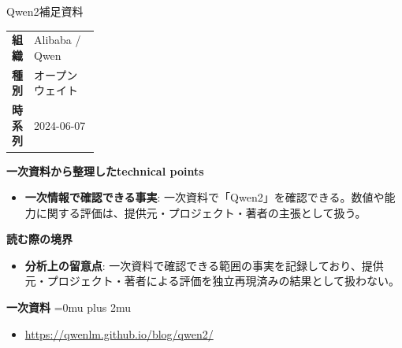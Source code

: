 \begin{technicalnote}{Qwen2}{補足資料}
\begingroup
\begin{tabularx}{\linewidth}{@{}>{\bfseries}p{0.22\linewidth}X@{}}
組織 & Alibaba / Qwen \\
種別 & オープンウェイト \\
時系列 & 2024-06-07 \\
\end{tabularx}
\smallskip
{\bfseries 一次資料から整理したtechnical points}
\begin{itemize}[leftmargin=1.5em,itemsep=0.35em]
\item \textbf{一次情報で確認できる事実}: 一次資料で「Qwen2」を確認できる。数値や能力に関する評価は、提供元・プロジェクト・著者の主張として扱う。
\end{itemize}
\begin{minipage}{\linewidth}
{\bfseries 読む際の境界}
\begin{itemize}[leftmargin=1.5em,itemsep=0.35em]
\item \textbf{分析上の留意点}: 一次資料で確認できる範囲の事実を記録しており、提供元・プロジェクト・著者による評価を独立再現済みの結果として扱わない。
\end{itemize}
\begin{samepage}
{\bfseries 一次資料}
\begingroup\sloppy
\Urlmuskip=0mu plus 2mu\relax
\begin{itemize}[leftmargin=1.5em,itemsep=0.25em]
\item {\scriptsize\url{https://qwenlm.github.io/blog/qwen2/}}
\end{itemize}
\endgroup
\end{samepage}
\end{minipage}
\endgroup
\end{technicalnote}
\medskip


